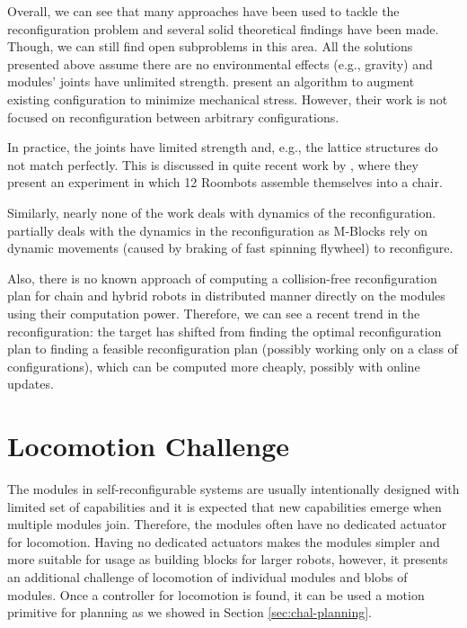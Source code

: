 Overall, we can see that many approaches have been used to tackle the
reconfiguration problem and several solid theoretical findings have been made.
Though, we can still find open subproblems in this area. All the solutions
presented above assume there are no environmental effects (e.g., gravity) and
modules' joints have unlimited strength. \textcite{DBLP:journals/jr/SuzukiIKK11}
present an algorithm to augment existing configuration to minimize mechanical
stress. However, their work is not focused on reconfiguration between arbitrary
configurations.

In practice, the joints have limited strength and, e.g., the lattice structures
do not match perfectly. This is discussed in quite recent work by
\textcite{DBLP:journals/ras/HauserMLKBI20}, where they present an experiment in
which 12 Roombots assemble themselves into a chair.

Similarly, nearly none of the work deals with dynamics of the reconfiguration.
\textcite{DBLP:conf/iros/RomanishinMR19} partially deals with the dynamics in
the reconfiguration as M-Blocks rely on dynamic movements (caused by braking of
fast spinning flywheel) to reconfigure.

Also, there is no known approach of computing a collision-free reconfiguration
plan for chain and hybrid robots in distributed manner directly on the modules
using their computation power. Therefore, we can see a recent trend in the
reconfiguration: the target has shifted from finding the optimal reconfiguration
plan to finding a feasible reconfiguration plan (possibly working only on a
class of configurations), which can be computed more cheaply, possibly with
online updates.

\section{Locomotion Challenge}\label{sec:chal-locomotion}

The modules in self-reconfigurable systems are usually intentionally designed
with limited set of capabilities and it is expected that new capabilities emerge
when multiple modules join. Therefore, the modules often have no dedicated
actuator for locomotion. Having no dedicated actuators makes the modules simpler
and more suitable for usage as building blocks for larger robots, however, it
presents an additional challenge of locomotion of individual modules and blobs
of modules. Once a controller for locomotion is found, it can be used a motion
primitive for planning as we showed in Section \ref{sec:chal-planning}.


